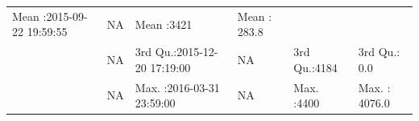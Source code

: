 \documentclass[]{article}
\begin{document}
\begin{longtable}[]{@{}llllll@{}}
\begin{minipage}[t]{0.24\columnwidth}
Mean :2015-09-22 19:59:55\strut
\end{minipage} & \begin{minipage}[t]{0.15\columnwidth}\raggedright\strut
NA\strut
\end{minipage} & \begin{minipage}[t]{0.12\columnwidth}\raggedright\strut
Mean :3421\strut
\end{minipage} & \begin{minipage}[t]{0.14\columnwidth}\raggedright\strut
Mean : 283.8\strut
\end{minipage}\tabularnewline
\begin{minipage}[t]{0.03\columnwidth}\raggedright\strut
\strut
\end{minipage} & \begin{minipage}[t]{0.15\columnwidth}\raggedright\strut
NA\strut
\end{minipage} & \begin{minipage}[t]{0.24\columnwidth}\raggedright\strut
3rd Qu.:2015-12-20 17:19:00\strut
\end{minipage} & \begin{minipage}[t]{0.15\columnwidth}\raggedright\strut
NA\strut
\end{minipage} & \begin{minipage}[t]{0.12\columnwidth}\raggedright\strut
3rd Qu.:4184\strut
\end{minipage} & \begin{minipage}[t]{0.14\columnwidth}\raggedright\strut
3rd Qu.: 0.0\strut
\end{minipage}\tabularnewline
\begin{minipage}[t]{0.03\columnwidth}\raggedright\strut
\strut
\end{minipage} & \begin{minipage}[t]{0.15\columnwidth}\raggedright\strut
NA\strut
\end{minipage} & \begin{minipage}[t]{0.24\columnwidth}\raggedright\strut
Max. :2016-03-31 23:59:00\strut
\end{minipage} & \begin{minipage}[t]{0.15\columnwidth}\raggedright\strut
NA\strut
\end{minipage} & \begin{minipage}[t]{0.12\columnwidth}\raggedright\strut
Max. :4400\strut
\end{minipage} & \begin{minipage}[t]{0.14\columnwidth}\raggedright\strut
Max. : 4076.0\strut
\end{minipage}\tabularnewline
\bottomrule
\end{longtable}
\end{document}
